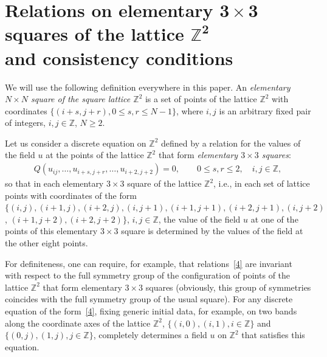 \documentclass[pdftex]{sigma}
\begin{document}
\section[Relations on elementary $3 \times 3$ squares of the
lattice $\mathbb{Z}^2$ and consistency conditions]{Relations on elementary $\boldsymbol{3 \times 3}$ squares of the
lattice $\boldsymbol{\mathbb{Z}^2}$\\ and consistency conditions}



We will use the following def\/inition everywhere in this paper. An
{\it elementary $N \times N$ square of the square lattice
$\mathbb{Z}^2$} is a set of points of the lattice $\mathbb{Z}^2$
with coordinates $\{(i + s, j + r), 0 \leq s, r \leq N - 1\}$,
where $i, j$ is an arbitrary f\/ixed pair of integers, $i, j \in
\mathbb{Z}$, $N \geq 2$.





Let us consider a discrete equation on $\mathbb{Z}^2$ def\/ined by a
relation for the values of the f\/ield $u$ at the points of the
lattice $\mathbb{Z}^2$ that form {\it elementary $3 \times 3$
squares}:
\begin{gather} Q (u_{i j}, \ldots, u_{i + s, j + r}, \ldots, u_{i +
2, j + 2}) = 0, \qquad  0 \leq s, r \leq 2, \quad i, j \in \mathbb{Z},
\label{4}\end{gather}
so that in each elementary $3 \times 3$ square of the
lattice $\mathbb{Z}^2$, i.e., in each set of lattice points with
coordinates of the form $\{(i, j), (i + 1, j), (i + 2, j), (i, j +
1), (i + 1, j + 1), (i + 2, j + 1), (i, j + 2)$, $(i + 1, j + 2), (i +
2, j + 2)\}$, $i, j \in \mathbb{Z}$, the value of the f\/ield $u$ at
one of the points of this elementary $3 \times 3$ square is
determined by the values of the f\/ield at the other eight points.


For def\/initeness, one can require, for example, that relations~\eqref{4}
are invariant with respect to the full symmetry group of
the conf\/iguration of points of the lattice $\mathbb{Z}^2$ that form
elementary $3 \times 3$ squares (obviously, this group of symmetries
coincides with the full symmetry group of the usual square). For any
discrete equation of the form~\eqref{4}, f\/ixing generic initial
data, for example, on two bands along the coordinate axes of the
lattice $\mathbb{Z}^2$, $\{(i, 0), (i, 1), i \in \mathbb{Z} \}$ and
$\{(0, j), (1, j), j \in \mathbb{Z} \}$, completely determines a
f\/ield $u$ on $\mathbb{Z}^2$ that satisf\/ies this equation.
\end{document}

